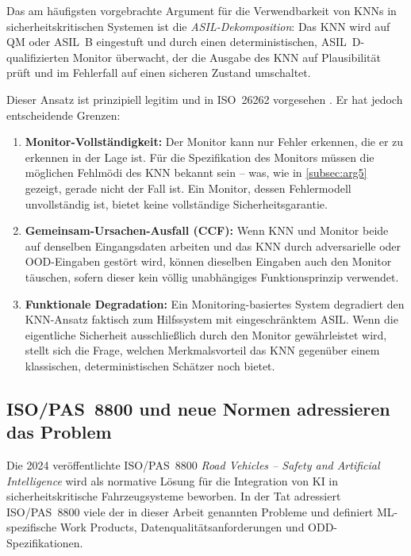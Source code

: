 ﻿\documentclass[12pt,a4paper]{article}
\begin{document}
Das am h\"aufigsten vorgebrachte Argument f\"ur die Verwendbarkeit von KNNs in
sicherheitskritischen Systemen ist die \emph{ASIL-Dekomposition}: Das KNN wird auf
QM oder ASIL~B eingestuft und durch einen deterministischen, ASIL~D-qualifizierten
Monitor \"uberwacht, der die Ausgabe des KNN auf Plausibilit\"at pr\"uft und im
Fehlerfall auf einen sicheren Zustand umschaltet.

Dieser Ansatz ist prinzipiell legitim und in ISO~26262 vorgesehen
\cite{iso26262_9}. Er hat jedoch entscheidende Grenzen:

\begin{enumerate}
  \item \textbf{Monitor-Vollst\"andigkeit:} Der Monitor kann nur Fehler erkennen,
    die er zu erkennen in der Lage ist. F\"ur die Spezifikation des Monitors m\"ussen
    die m\"oglichen Fehlm\"odi des KNN bekannt sein -- was, wie in
    \cref{subsec:arg5} gezeigt, gerade nicht der Fall ist. Ein Monitor, dessen
    Fehlermodell unvollst\"andig ist, bietet keine vollst\"andige Sicherheitsgarantie.

  \item \textbf{Gemeinsam-Ursachen-Ausfall (CCF):} Wenn KNN und Monitor beide
    auf denselben Eingangsdaten arbeiten und das KNN durch adversarielle oder
    OOD-Eingaben gest\"ort wird, k\"onnen dieselben Eingaben auch den Monitor
    t\"auschen, sofern dieser kein v\"ollig unabh\"angiges Funktionsprinzip verwendet.

  \item \textbf{Funktionale Degradation:} Ein Monitoring-basiertes System degradiert
    den KNN-Ansatz faktisch zum Hilfssystem mit eingeschr\"anktem ASIL. Wenn die
    eigentliche Sicherheit ausschlie\ss{}lich durch den Monitor gew\"ahrleistet wird,
    stellt sich die Frage, welchen Merkmalsvorteil das KNN gegen\"uber einem
    klassischen, deterministischen Sch\"atzer noch bietet.
\end{enumerate}

\subsection{ISO/PAS~8800 und neue Normen adressieren das Problem}
\label{subsec:gegenarg2}

Die 2024 ver\"offentlichte ISO/PAS~8800 \emph{Road Vehicles -- Safety and Artificial
Intelligence} \cite{isopas8800} wird als normative L\"osung f\"ur die Integration von
KI in sicherheitskritische Fahrzeugsysteme beworben. In der Tat adressiert ISO/PAS~8800
viele der in dieser Arbeit genannten Probleme und definiert ML-spezifische Work Products,
Datenqualit\"atsanforderungen und ODD-Spezifikationen.
\end{document}
